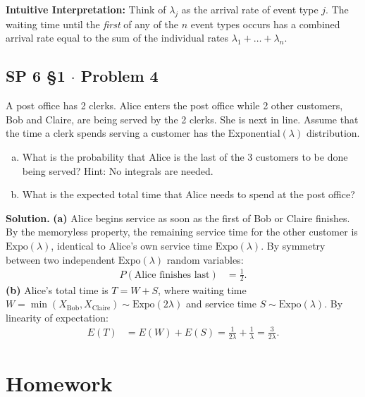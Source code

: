 \documentclass[11pt,a4paper]{article}
\begin{document}
\textbf{Intuitive Interpretation:} Think of $\lambda_j$ as the arrival rate of event type $j$. The waiting time until the \textit{first} of any of the $n$ event types occurs has a combined arrival rate equal to the sum of the individual rates $\lambda_1 + \dots + \lambda_n$.

\vspace{10pt}
\subsection{SP 6 \S1 $\cdot$ Problem 4}
\begin{tcolorbox}[title={SP 6 \S1 $\cdot$ Problem 4}]
A post office has 2 clerks. Alice enters the post office while 2 other customers, Bob and Claire, are being served by the 2 clerks. She is next in line. Assume that the time a clerk spends serving a customer has the $\text{Exponential}(\lambda)$ distribution.
\begin{enumerate}[(a)]
\item What is the probability that Alice is the last of the 3 customers to be done being served?
Hint: No integrals are needed.
\item What is the expected total time that Alice needs to spend at the post office?
\end{enumerate}
\end{tcolorbox}

\noindent \textbf{Solution.} \textbf{(a)} Alice begins service as soon as the first of Bob or Claire finishes. By the memoryless property, the remaining service time for the other customer is $\text{Expo}(\lambda)$, identical to Alice's own service time $\text{Expo}(\lambda)$. By symmetry between two independent $\text{Expo}(\lambda)$ random variables:
\begin{align*}
P(\text{Alice finishes last}) &= \frac{1}{2}.
\end{align*}
\textbf{(b)} Alice's total time is $T = W + S$, where waiting time $W = \min(X_{\text{Bob}}, X_{\text{Claire}}) \sim \text{Expo}(2\lambda)$ and service time $S \sim \text{Expo}(\lambda)$. By linearity of expectation:
\begin{align*}
E(T) &= E(W) + E(S) = \frac{1}{2\lambda} + \frac{1}{\lambda} = \frac{3}{2\lambda}.
\end{align*}

\vspace{15pt}
\section{Homework}
\end{document}
